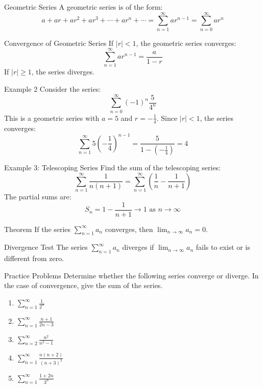 \documentclass[aspectratio=169,xcolor=dvipsnames,svgnames,x11names,fleqn]{beamer}
\begin{document}
\begin{frame}{Geometric Series}
A geometric series is of the form:
$$a + ar + ar^2 + ar^3 + \cdots + ar^n + \cdots = \sum_{n=1}^{\infty} ar^{n-1} = \sum_{n=0}^{\infty} ar^n$$
\end{frame}

\begin{frame}{Convergence of Geometric Series}
If $|r| < 1$, the geometric series converges:
$$\sum_{n=1}^{\infty} ar^{n-1} = \frac{a}{1 - r}$$
If $|r| \geq 1$, the series diverges.
\end{frame}

\begin{frame}{Example 2}
Consider the series:
$$\sum_{n=0}^{\infty} (-1)^n \frac{5}{4^n}$$
This is a geometric series with $a = 5$ and $r = -\frac{1}{4}$. Since $|r| < 1$, the series converges:
$$\sum_{n=1}^{\infty} 5 \left(-\frac{1}{4}\right)^{n-1} = \frac{5}{1 - \left(-\frac{1}{4}\right)} = 4$$
\end{frame}

\begin{frame}{Example 3: Telescoping Series}
Find the sum of the telescoping series:
$$\sum_{n=1}^{\infty} \frac{1}{n(n+1)} = \sum_{n=1}^{\infty} \left(\frac{1}{n} - \frac{1}{n+1}\right)$$
The partial sums are:
$$S_n = 1 - \frac{1}{n+1} \to 1 \text{ as } n \to \infty$$
\end{frame}

\begin{frame}{Theorem}
If the series $\sum_{n=1}^{\infty} a_n$ converges, then $\lim_{n \to \infty} a_n = 0$.
\end{frame}

\begin{frame}{Divergence Test}
The series $\sum_{n=1}^{\infty} a_n$ diverges if $\lim_{n \to \infty} a_n$ fails to exist or is different from zero.
\end{frame}

\begin{frame}{Practice Problems}
Determine whether the following series converge or diverge. In the case of convergence, give the sum of the series.
\begin{enumerate}
    \item $\sum_{n=1}^{\infty} \frac{1}{2^n}$
    \item $\sum_{n=1}^{\infty} \frac{n+1}{2n-3}$
    \item $\sum_{n=2}^{\infty} \frac{n^2}{n^2-1}$
    \item $\sum_{n=1}^{\infty} \frac{n(n+2)}{(n+3)^2}$
    \item $\sum_{n=1}^{\infty} \frac{1+2n}{3^n}$
\end{enumerate}
\end{frame}
\end{document}
